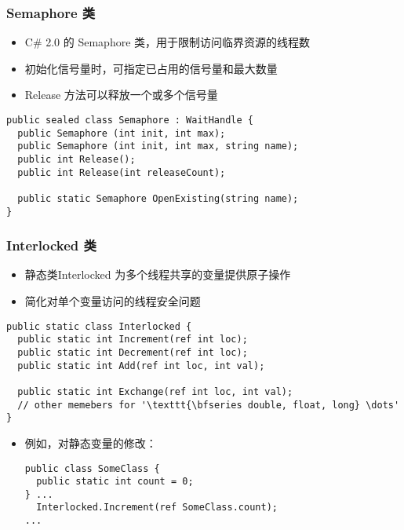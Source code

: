 \begin{frame}[fragile]
\frametitle{Semaphore 类}
\begin{itemize}
\item C\# 2.0 的 Semaphore 类，用于限制访问临界资源的线程数
\item 初始化信号量时，可指定已占用的信号量和最大数量
\item Release 方法可以释放一个或多个信号量
\end{itemize}
\begin{lstlisting}
public sealed class Semaphore : WaitHandle {
  public Semaphore (int init, int max);
  public Semaphore (int init, int max, string name);
  public int Release();
  public int Release(int releaseCount);

  public static Semaphore OpenExisting(string name);
}
\end{lstlisting}
\end{frame}

\begin{frame}[fragile]
\frametitle{Interlocked 类}
\begin{itemize}
\item 静态类Interlocked 为多个线程共享的变量提供原子操作
\item 简化对单个变量访问的线程安全问题
\end{itemize}
\begin{lstlisting}[escapeinside='']
public static class Interlocked {
  public static int Increment(ref int loc);
  public static int Decrement(ref int loc);
  public static int Add(ref int loc, int val);

  public static int Exchange(ref int loc, int val);
  // other memebers for '\texttt{\bfseries double, float, long} \dots' 
}
\end{lstlisting}
\begin{itemize}
\item 例如，对静态变量的修改：
\begin{lstlisting}
public class SomeClass {
  public static int count = 0;
} ...
  Interlocked.Increment(ref SomeClass.count);
...
\end{lstlisting}
\end{itemize}
\end{frame}

